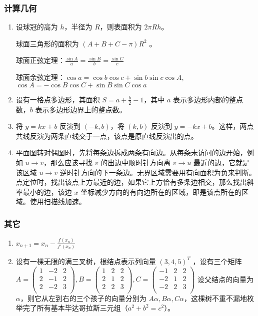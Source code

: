 \subsubsection{计算几何}

\begin{enumerate}

\item 设球冠的高为 $h$，半径为 $R$，则表面积为 $2\pi Rh$。

球面三角形的面积为 $(A+B+C-\pi)R^{2}$ 。

球面正弦定理：$\frac{\sin A}{a} = \frac{\sin B}{b} = \frac{\sin C}{c}$

球面余弦定理：$\cos a=\cos b\cos c+\sin b\sin c\cos A$, $\cos A=-\cos B\cos C+\sin B\sin C\cos a$

\item 设有一格点多边形，其面积 $S=a+\frac{b}{2}-1$，其中 $a$ 表示多边形内部的整点数，$b$ 表示多边形边界上的整点数。

\item 将 $y=kx+b$ 反演到 $(-k,b)$，将 $(k,b)$ 反演到 $y=-kx+b$。这样，两点共线反演为两条直线交于一点，该点是原直线反演出的点。

\item 平面图转对偶图时，先将每条边拆成两条有向边。从每条未访问的边开始，例如 $u\to v$，那么应该寻找 $v$ 的出边中顺时针方向离 $v\to u$ 最近的边，它就是该区域 $u\to v$ 逆时针方向的下一条边。无界区域需要用有向面积为负来判断。点定位时，找出该点上方最近的边，如果它上方恰有多条边相交，那么找出斜率最小的边，该边 $x$ 坐标减少方向的有向边所在的区域，即是该点所在的区域。使用扫描线加速。

\end{enumerate}

\subsubsection{其它}

\begin{enumerate}

\item $x_{n+1}=x_{n}-\frac{f(x_{n})}{f'(x_{n})}$

\item 设有一棵无限的满三叉树，根结点表示列向量 $(3,4,5)^{T}$ ，设有三个矩阵 $
A=\begin{pmatrix}
1&-2&2\\
2&-1&2\\
2&-2&3\\
\end{pmatrix}
,
B=\begin{pmatrix}
1&2&2\\
2&1&2\\
2&2&3\\
\end{pmatrix}
,
C=\begin{pmatrix}
-1&2&2\\
-2&1&2\\
-2&2&3\\
\end{pmatrix}
$ 设父结点的向量为 $\alpha$，则它从左到右的三个孩子的向量分别为 $A\alpha, B\alpha, C\alpha$，这棵树不重不漏地枚举完了所有基本毕达哥拉斯三元组（$a^{2}+b^{2}=c^{2}$）。


\end{enumerate}
